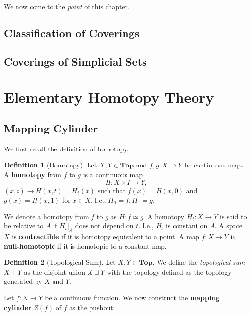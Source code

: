 \documentclass{article}
\theoremstyle{definition}
\newtheorem{defn}{Definition}[section]
\newcommand{\cat}{\mathbf}
\begin{document}
We now come to the \textit{point} of this chapter.
\subsection{Classification of Coverings}
\subsection{Coverings of Simplicial Sets}
\section{Elementary Homotopy Theory}
\subsection{Mapping Cylinder}
We first recall the definition of homotopy.
\begin{defn}[Homotopy]
Let $X,Y\in\cat{Top}$ and $f,g:X\rightarrow Y$ be continuous maps. A \textbf{homotopy} from $f$ to $g$ is a continuous map
\[H:X\times I\rightarrow Y,\] $(x,t)\rightarrow H(x,t)=H_{t}(x)$ such that $f(x)=H(x,0)$ and $g(x)=H(x,1)$ for $x\in X$. I.e., $H_{0}=f,H_{1}=g.$
\end{defn}
We denote a homotopy from $f$ to $g$ as $H:f\simeq g.$ A homotopy $H_{t}:X\rightarrow Y$ is said to be relative to $A$ if $H_{t}|_{A}$ does not depend on $t$. I.e., $H_{t}$ is constant on $A$. A space $X$ is \textbf{contractible} if it is homotopy equivalent to a point. A map $f:X\rightarrow Y$ is \textbf{null-homotopic} if it is homotopic to a constant map. 
\begin{defn}[Topological Sum]
Let $X,Y\in\cat{Top}$. We define the \textit{topological sum} $X+Y$ as the disjoint union $X\sqcup Y$ with the topology defined as the topology generated by $X$ and $Y$.
\end{defn}
Let $f:X\rightarrow Y$ be a continuous function. We now construct the \textbf{mapping cylinder} $Z(f)$ of $f$ as the pushout:
\end{document}
